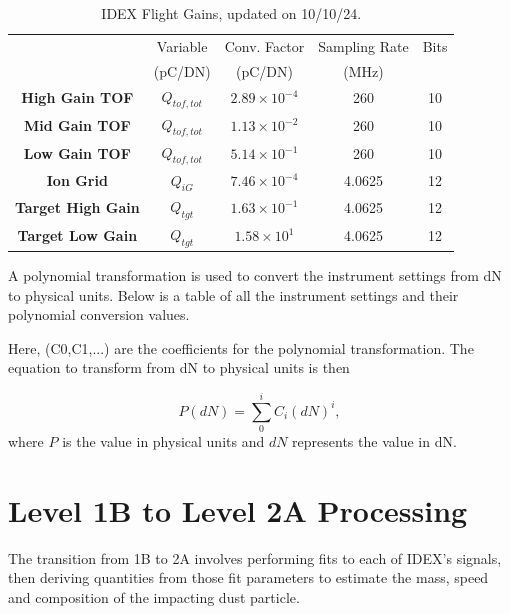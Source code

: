 \begin{table}[h!]
\caption{IDEX Flight Gains, updated on 10/10/24.\\}
\centering
\begin{tabular}{c|c|c|c|c}
 \hline \hline
  & Variable  & Conv. Factor & Sampling Rate  & Bits \\ 
  & (pC/DN)  & (pC/DN) & (MHz)  &  \\ \hline\hline
 \textbf{High Gain TOF}   &  $Q_{tof,tot}$   & $2.89 \times 10^{-4}$ &  260  &  10 \\ \hline
 \textbf{Mid Gain TOF}   &  $Q_{tof,tot}$  & $1.13 \times 10^{-2}$ &  260  &  10 \\ \hline
 \textbf{Low Gain TOF}   &  $Q_{tof,tot}$  & $5.14 \times 10^{-1}$ &  260  &  10 \\ \hline
 \textbf{Ion Grid}   &   $Q_{iG}$   &   $7.46 \times 10^{-4}$ & 4.0625 &  12 \\ \hline
 \textbf{Target High Gain}   &  $Q_{tgt}$   &  $1.63 \times 10^{-1}$ & 4.0625 &  12 \\ \hline
 \textbf{Target Low Gain}   &  $Q_{tgt}$   &    $1.58 \times 10^{1}$ & 4.0625 &  12 \\ \hline
\end{tabular}
\label{table:dntopc}
\end{table}

A polynomial transformation is used to convert the instrument settings from dN to physical units. Below is a table of all the instrument settings and their polynomial conversion values.

% 

Here, (C0,C1,...) are the coefficients for the polynomial transformation. The equation to transform from dN to physical units is then

\begin{equation}
    P(dN) = \sum_{0}^{i} C_{i}(dN)^{i},
\end{equation}
where $P$ is the value in physical units and $dN$ represents the value in dN.


\section{Level 1B to Level 2A Processing}
The transition from 1B to 2A involves performing fits to each of IDEX's signals, then deriving quantities from those fit parameters to estimate the mass, speed and composition of the impacting dust particle.


